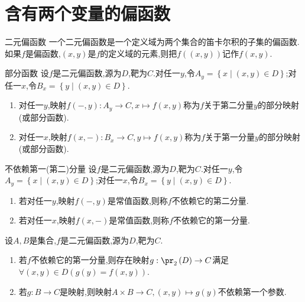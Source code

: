 \section{含有两个变量的偏函数}

\begin{definition}{二元偏函数}{}
	一个二元偏函数是一个定义域为两个集合的笛卡尔积的子集的偏函数.如果$f$是偏函数,$\left(x,y\right)$是$f$的定义域的元素,则把$f\left(\left(x,y\right)\right)$记作$f\left(x,y\right)$.
\end{definition}

\begin{definition}{部分函数}{}
	设$f$是二元偏函数,源为$D$,靶为$C$.对任一$y$,令$A_{y}=\left\{x\middle|\left(x,y\right)\in D\right\}$;对任一$x$,令$B_{x}=\left\{y\middle|\left(x,y\right)\in D\right\}$.
	\begin{enumerate}
		\item 对任一$y$,映射$f\left(-,y\right):A_{y}\to C,x\mapsto f\left(x,y\right)$称为$f$关于第二分量$y$的部分映射(或部分函数).
		\item 对任一$x$,映射$f\left(x,-\right):B_{x}\to C,y\mapsto f\left(x,y\right)$称为$f$关于第一分量$y$的部分映射(或部分函数).
	\end{enumerate}
\end{definition}

\begin{definition}{不依赖第一(第二)分量}{}
	设$f$是二元偏函数,源为$D$,靶为$C$.对任一$y$,令$A_{y}=\left\{x\middle|\left(x,y\right)\in D\right\}$;对任一$x$,令$B_{x}=\left\{y\middle|\left(x,y\right)\in D\right\}$.
	\begin{enumerate}
		\item 若对任一$y$,映射$f\left(-,y\right)$是常值函数,则称$f$不依赖它的第二分量.
		\item 若对任一$x$,映射$f\left(x,-\right)$是常值函数,则称$f$不依赖它的第一分量.
	\end{enumerate}
\end{definition}

\begin{proposition}{}{}
	设$A,B$是集合,$f$是二元偏函数,源为$D$,靶为$C$.
	\begin{enumerate}
		\item 若$f$不依赖它的第一分量,则存在映射$g:\pr_{2}\left(D\right)\to C$满足$\forall\left(x,y\right)\in D\left(g\left(y\right)=f\left(x,y\right)\right)$.
		\item 若$g:B\to C$是映射,则映射$A\times B\to C,\left(x,y\right)\mapsto g\left(y\right)$不依赖第一个参数.
	\end{enumerate}
\end{proposition}

